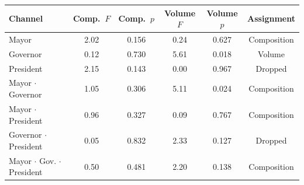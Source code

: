 \begin{tabular}{@{}lccccc@{}}
\toprule
Channel & Comp.\ $F$ & Comp.\ $p$ & Volume $F$ & Volume $p$ & Assignment \\
\midrule
Mayor & 2.02 & 0.156 & 0.24 & 0.627 & Composition \\
Governor & 0.12 & 0.730 & 5.61 & 0.018 & Volume \\
President & 2.15 & 0.143 & 0.00 & 0.967 & Dropped \\
Mayor $\cdot$ Governor & 1.05 & 0.306 & 5.11 & 0.024 & Composition \\
Mayor $\cdot$ President & 0.96 & 0.327 & 0.09 & 0.767 & Composition \\
Governor $\cdot$ President & 0.05 & 0.832 & 2.33 & 0.127 & Dropped \\
Mayor $\cdot$ Gov. $\cdot$ President & 0.50 & 0.481 & 2.20 & 0.138 & Composition \\
\bottomrule
\end{tabular}
